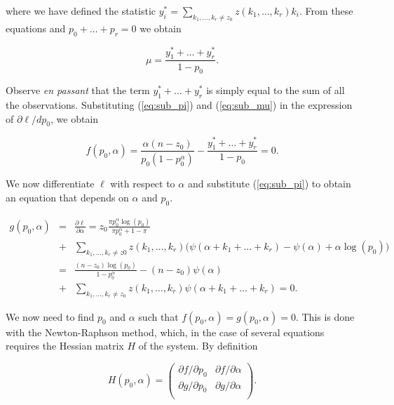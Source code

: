 \documentclass[12pt]{article}
\begin{document}
\begin{appendices}
    \noindent
    where we have defined the statistic
    $y_i^* = \sum_{k_1, \ldots, k_r \neq z_0} z(k_1, \ldots, k_r) k_i$.
    From these equations and $p_0+\ldots+p_r = 0$ we obtain

    \begin{equation}
\label{eq:sub_mu}
      \mu = \frac{y_1^*+\ldots+y_r^*}{1-p_0}.
    \end{equation}

    Observe \textit{en passant} that the term
    $y_1^* + \ldots + y_r^*$ is simply equal to the sum of all the
    observations.
    Substituting (\ref{eq:sub_pi}) and (\ref{eq:sub_mu}) in the
    expression of $\partial\ell/dp_0$, we obtain 

    \begin{equation}
      f(p_0, \alpha) = \frac{\alpha(n-z_0)}{p_0(1-p_0^{\alpha})} -
      \frac{y_1^*+\ldots+y_r^*}{1-p_0} = 0.
    \end{equation}

    We now differentiate $\ell$ with respect to $\alpha$ and
    substitute (\ref{eq:sub_pi}) to obtain an equation that
    depends on $\alpha$ and $p_0$.

    \begin{eqnarray*}
      g(p_0, \alpha) &=& \frac{\partial\ell}{\partial\alpha} =
      z_0 \frac{\pi p_0^{\alpha}\log(p_0)}
      {\pi p_0^{\alpha}+1-\pi} \\
      &+& \sum_{k_1, \ldots, k_r \neq z0}
      z(k_1, \ldots, k_r) \Big(\psi(\alpha+k_1 + \ldots +k_r)
      -\psi(\alpha) +\alpha\log(p_0)\Big) \\
        &=& \frac{(n-z_0)\log(p_0)}{1-p_0^{\alpha}}
        -(n-z_0) \psi(\alpha) \\ 
        &+& \sum_{k_1, \ldots, k_r \neq z_0} z(k_1, \ldots, k_r)
        \psi(\alpha+k_1 + \ldots +k_r) = 0.
    \end{eqnarray*}

    We now need to find $p_0$ and $\alpha$ such that
    $f(p_0, \alpha) = g(p_0, \alpha) = 0$. This is done with the
    Newton-Raphson method, which, in the case of several equations
    requires the Hessian matrix $H$ of the system. By definition

    \begin{equation*}
      H(p_0,\alpha) = \left(
      \begin{array}{ll}
        \partial f/\partial p_0 &
        \partial f/\partial \alpha  \\
        \partial g/\partial p_0 &
        \partial g/\partial \alpha  \\
      \end{array}
      \right).
    \end{equation*}


\end{appendices}
\end{document}
